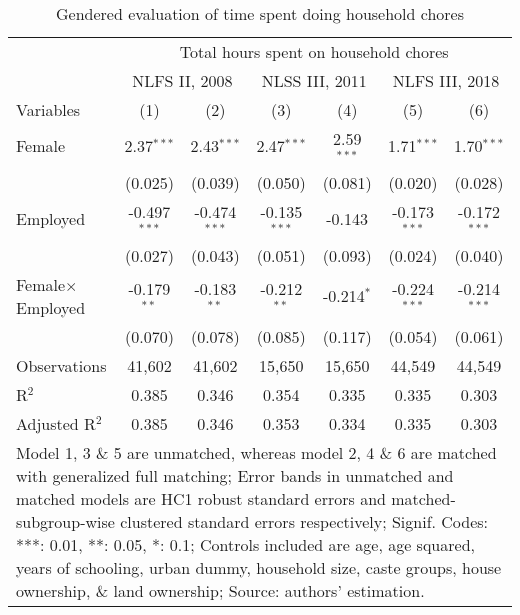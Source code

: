 
\begin{table}[htbp]
   \caption{Gendered evaluation of time spent doing household chores}
   \centering
   \begin{tabular}{lcccccc}
      \midrule \midrule
      & \multicolumn{6}{c}{Total hours spent on household chores }\\
      \cmidrule(l{3pt}r{3pt}){2-7}
      		& \multicolumn{2}{c}{NLFS II, 2008} & \multicolumn{2}{c}{NLSS III, 2011}
      		& \multicolumn{2}{c}{NLFS III, 2018} \\
      \cmidrule(l{3pt}r{3pt}){2-3} \cmidrule(l{3pt}r{3pt}){4-5} \cmidrule(l{3pt}r{3pt}){6-7}			
       Variables     & (1)            & (2)             & (3)            & (4)          & (5)            & (6)\\  
      \midrule
      Female                    & 2.37$^{***}$   & 2.43$^{***}$   & 2.47$^{***}$   & 2.59$^{***}$ & 1.71$^{***}$   & 1.70$^{***}$\\   
                                & (0.025)        & (0.039)        & (0.050)        & (0.081)      & (0.020)        & (0.028)\\   
      Employed                  & -0.497$^{***}$ & -0.474$^{***}$ & -0.135$^{***}$ & -0.143       & -0.173$^{***}$ & -0.172$^{***}$\\   
                                & (0.027)        & (0.043)        & (0.051)        & (0.093)      & (0.024)        & (0.040)\\   
      Female$\times$Employed  & -0.179$^{**}$  & -0.183$^{**}$  & -0.212$^{**}$  & -0.214$^{*}$ & -0.224$^{***}$ & -0.214$^{***}$\\   
                                & (0.070)        & (0.078)        & (0.085)        & (0.117)      & (0.054)        & (0.061)\\   
      \midrule
      
      Observations              & 41,602        & 41,602         & 15,650         & 15,650       & 44,549         & 44,549\\  
      R$^2$                     & 0.385        & 0.346        & 0.354        & 0.335      & 0.335        & 0.303\\  
      Adjusted R$^2$            & 0.385        & 0.346        & 0.353        & 0.334      & 0.335        & 0.303\\  
      \midrule \midrule
      \multicolumn{7}{p{15.2cm}}{\footnotesize{Model 1, 3 \& 5 are unmatched, whereas model 2, 4 \& 6 are matched with generalized full matching; Error bands in unmatched and matched models are HC1 robust standard errors and matched-subgroup-wise clustered standard errors respectively; Signif. Codes: ***: 0.01, **: 0.05, *: 0.1; Controls included are age, age squared, years of schooling, urban dummy, household size, caste groups, house ownership, \& land ownership;  Source: authors' estimation.}}\\
      \end{tabular}%
  \label{tab:genderedTimeUse}
\end{table}


